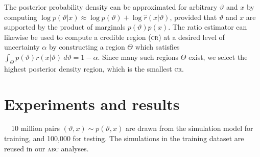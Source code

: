 \documentclass{article}
\begin{document}
The posterior probability density can be approximated for arbitrary $\vartheta$ and $x$ by computing $\log p(\vartheta\vert x) \approx \log p(\vartheta) + \log \hat{r}(x\vert\vartheta)$,
provided that $\vartheta$ and $x$ are supported
by the product of marginals $p(\vartheta)p(x)$.
The ratio estimator can likewise be used to compute a credible region (\textsc{cr}) at a desired level of uncertainty $\alpha$
by constructing a region $\Theta$ which satisfies
$\label{eq:credible_interval}\int_\Theta p(\vartheta)r(x\vert\vartheta)~d\vartheta = 1 - \alpha.$
Since many such regions $\Theta$ exist, we select the
highest posterior density region, which is the smallest \textsc{cr}.

\section{Experiments and results}
\label{sec:results}
~~10 million pairs $(\vartheta,x)\sim p(\vartheta,x)$ are drawn from the simulation model for training, and
100,000 for testing. The simulations in the training dataset are reused in our \textsc{abc} analyses.
\end{document}
